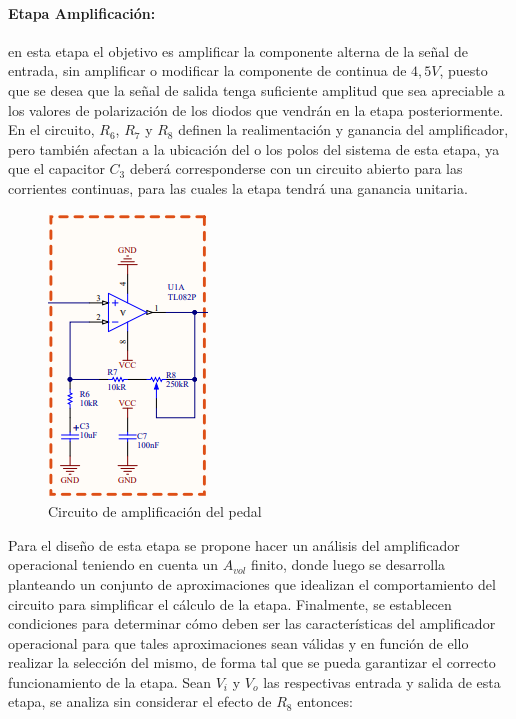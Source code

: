 \paragraph*{Etapa Amplificaci\'on:} en esta etapa el objetivo es amplificar la componente alterna de la se\~nal de entrada, sin amplificar o modificar la componente de continua
de $4,5V$, puesto que se desea que la se\~nal de salida tenga suficiente amplitud que sea apreciable a los valores de polarizaci\'on de los diodos que vendr\'an en la etapa posteriormente.
En el circuito, $R_6$, $R_7$ y $R_8$ definen la realimentaci\'on y ganancia del amplificador, pero tambi\'en afectan a la ubicaci\'on del o los polos del sistema de esta etapa,
ya que el capacitor $C_3$ deber\'a corresponderse con un circuito abierto para las corrientes continuas, para las cuales la etapa tendr\'a una ganancia unitaria.

\begin{figure}[H]
    \centering
    \includegraphics[]{../EJ5/Recursos/circuito_amplificador.PNG}
    \caption{Circuito de amplificaci\'on del pedal}
    \label{fig:circuito_amplificador}
\end{figure}

Para el dise\~no de esta etapa se propone hacer un an\'alisis del amplificador operacional teniendo en cuenta
un $A_{vol}$ finito, donde luego se desarrolla planteando un conjunto de aproximaciones que idealizan el comportamiento del circuito
para simplificar el c\'alculo de la etapa. Finalmente, se establecen condiciones para determinar c\'omo deben ser las caracter\'isticas del amplificador
operacional para que tales aproximaciones sean v\'alidas y en funci\'on de ello realizar la selecci\'on del mismo, de forma tal
que se pueda garantizar el correcto funcionamiento de la etapa. Sean $V_i$ y $V_o$ las respectivas entrada y salida de esta etapa, se analiza sin considerar el efecto de $R_8$ entonces:

